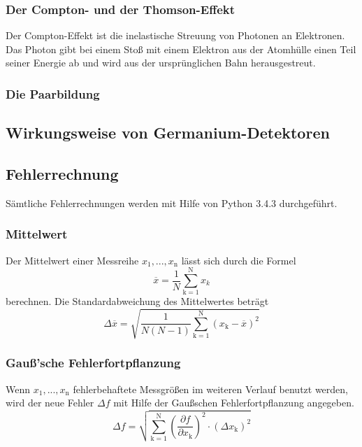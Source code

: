 \subsubsection{Der Compton- und der Thomson-Effekt}
Der Compton-Effekt ist die inelastische Streuung von Photonen an Elektronen. Das Photon gibt bei einem Stoß mit einem Elektron aus der Atomhülle einen Teil seiner Energie ab und wird aus der ursprünglichen Bahn herausgestreut.



\subsubsection{Die Paarbildung}








\subsection{Wirkungsweise von Germanium-Detektoren}




\subsection{Fehlerrechnung}
Sämtliche Fehlerrechnungen werden mit Hilfe von Python 3.4.3 durchgeführt.
\subsubsection{Mittelwert}
Der Mittelwert einer Messreihe $x_\text{1}, ... ,x_\text{n}$ lässt sich durch die Formel
\begin{equation}
	\overline{x} = \frac{1}{N} \sum_{\text{k}=1}^\text{N} x_k
	\label{eqn:ave}
\end{equation}
berechnen. Die Standardabweichung des Mittelwertes beträgt
\begin{equation}
	\Delta \overline{x} = \sqrt{ \frac{1}{N(N-1)} \sum_{\text{k}=1}^\text{N} (x_\text{k} - \overline{x})^2}
	\label{eqn:std}
\end{equation}

\subsubsection{Gauß'sche Fehlerfortpflanzung}
Wenn $x_\text{1}, ..., x_\text{n}$ fehlerbehaftete Messgrößen im weiteren Verlauf benutzt werden, wird der neue Fehler $\Delta f$ mit Hilfe der Gaußschen Fehlerfortpflanzung angegeben.
\begin{equation}
	\Delta f = \sqrt{\sum_{\text{k}=1}^\text{N} \left( \frac{ \partial f}{\partial x_\text{k}} \right) ^2 \cdot (\Delta x_\text{k})^2}
	\label{eqn:var}
\end{equation}

